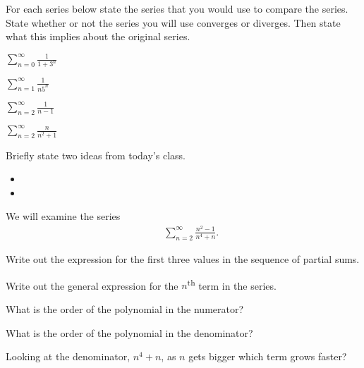 \begin{problem}
\item For each series below state the series that you would use to compare the series. State whether or not the series you will use converges or diverges.
Then state what this implies about the original series.
  \begin{subproblem}
    \item $\sum_{n=0}^\infty \frac{1}{1+3^n}$
      \vfill
    \item $\sum_{n=1}^\infty \frac{1}{n5^n}$
      \vfill
      \clearpage
    \item $\sum_{n=2}^\infty \frac{1}{n-1}$
      \vfill
    \item $\sum_{n=2}^\infty \frac{n}{n^2+1} $
      \vfill
  \end{subproblem}
\end{problem}


\postClass

\begin{problem}
\item Briefly state two ideas from today's class.
  \begin{itemize}
  \item
  \item
  \end{itemize}
\item
  \begin{subproblem}
    \item
  \end{subproblem}
\end{problem}



\begin{problem}
\item We will examine the series
    \begin{eqnarray*}
      & & \sum^\infty_{n=2} \frac{n^2-1}{n^4+n}.
    \end{eqnarray*}
    \begin{subproblem}
      \item Write out the expression for the first three values in the sequence of partial sums.
      \vfill
      \item Write out the general expression for the $n$\textsuperscript{th} term in the series.
        \vfill
      \item What is the order of the polynomial in the numerator?
      \vfill
      \item What is the order of the polynomial in the denominator?
      \vfill
      \item Looking at the denominator, $n^4+n$, as $n$ gets bigger which term grows faster?
      \vfill
    \end{subproblem}
\end{problem}


